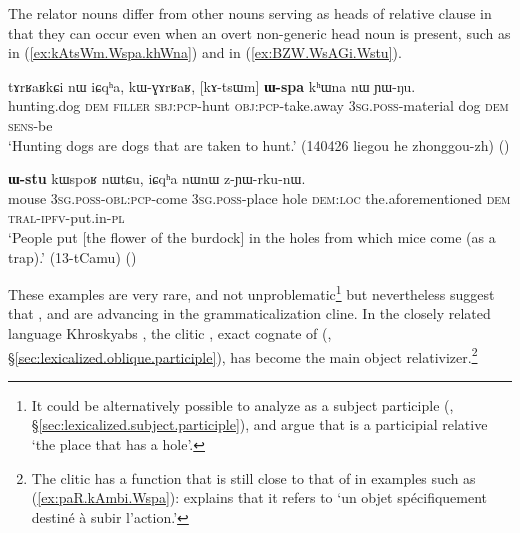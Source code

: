 The relator nouns differ from other nouns serving as heads of relative clause in that they can occur even when an overt non-generic head noun is present, such as  in (\ref{ex:kAtsWm.Wspa.khWna}) and  in (\ref{ex:BZW.WsAGi.Wstu}). 

 \begin{exe}
\ex \label{ex:kAtsWm.Wspa.khWna} 
\gll  tɤrʁaʁkɕi nɯ iɕqʰa, kɯ-ɣɤrʁaʁ, [kɤ-tsɯm] \textbf{ɯ-spa} kʰɯna nɯ ɲɯ-ŋu. \\
hunting.dog \textsc{dem} \textsc{filler} \textsc{sbj}:\textsc{pcp}-hunt \textsc{obj}:\textsc{pcp}-take.away \textsc{3sg}.\textsc{poss}-material dog \textsc{dem} \textsc{sens}-be \\
\glt `Hunting dogs are dogs that are taken to hunt.' (140426 liegou he zhonggou-zh)
()
\end{exe}  

 \begin{exe}
\ex \label{ex:BZW.WsAGi.Wstu} 
\gll  [βʑɯ ɯ-sɤ-ɣi] \textbf{ɯ-stu} kɯspoʁ nɯtɕu, iɕqʰa nɯnɯ z-ɲɯ-rku-nɯ. \\
mouse \textsc{3sg}.\textsc{poss}-\textsc{obl}:\textsc{pcp}-come \textsc{3sg}.\textsc{poss}-place hole \textsc{dem}:\textsc{loc} the.aforementioned \textsc{dem} \textsc{tral}-\textsc{ipfv}-put.in-\textsc{pl} \\
\glt `People put [the flower of the burdock] in the holes from which mice come (as a trap).' (13-tCamu)
()
\end{exe}  
  
These examples are very rare, and not unproblematic\footnote{It could be alternatively possible to analyze  as a subject participle   (, §\ref{sec:lexicalized.subject.participle}), and argue that  is a participial relative `the place that has a hole'. }  but nevertheless suggest that ,  and  are advancing in the grammaticalization cline.   In the closely related language Khroskyabs \citep[580]{lai17khroskyabs}, the clitic , exact cognate of   (, §\ref{sec:lexicalized.oblique.participle}), has become the main object relativizer.\footnote{The clitic  has a function that is still close to that of  in examples such as (\ref{ex:paR.kAmbi.Wspa}):   \citet[514]{lai17khroskyabs} explains that it refers to `un objet spécifiquement destiné à subir l’action.'  }
 
